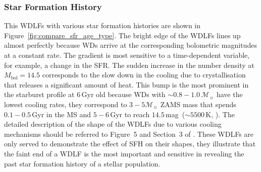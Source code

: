 \documentclass[fleqn,usenatbib]{rasti}
\newcommand{\msun}{\mathcal{M}_{\sun}}
\begin{document}
\subsubsection{Star Formation History}
This WDLFs with various star formation histories are shown in
Figure~\ref{fig:compare_sfr_age_type}. The bright edge of the WDLFs lines up
almost perfectly because WDs arrive at the corresponding bolometric magnitudes
at a constant rate. The gradient is most sensitive to a time-dependent
variable, for example, a change in the SFR. The sudden increase in the number
density at $M_\mathrm{bol}=14.5$ corresponds to the slow down in the cooling
due to crystallisation that releases a significant amount of heat. This bump
is the most prominent in the starburst profile at $6$\,Gyr old because WDs
with $\sim0.8-1.0\,\msun$ have the lowest cooling rates, they correspond
to $3-5\msun$ ZAMS mass that spends $0.1-0.5$\,Gyr in the MS and $5-6$\,Gyr
to reach $14.5$\,mag~($\sim 5500$\,K, \citealp{2019ApJ...876...67B}). The
detailed description of the shape of the WDLFs due to various cooling
mechanisms should be referred to Figure~5 and Section~3
of \citep{2001PASP..113..409F}. These WDLFs are only served to demonstrate
the effect of SFH on their shapes, they illustrate that the faint end
of a WDLF is the most important and sensitive in revealing the past
star formation history of a stellar population.
\end{document}
